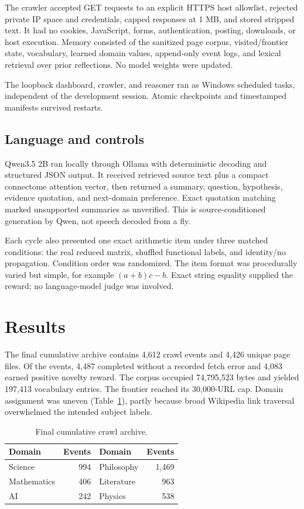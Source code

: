 \documentclass[9pt,twocolumn]{extarticle}
\begin{document}
The crawler accepted GET requests to an explicit HTTPS host allowlist, rejected private IP space and credentials, capped responses at 1 MB, and stored stripped text. It had no cookies, JavaScript, forms, authentication, posting, downloads, or host execution. Memory consisted of the sanitized page corpus, visited/frontier state, vocabulary, learned domain values, append-only event logs, and lexical retrieval over prior reflections. No model weights were updated.

The loopback dashboard, crawler, and reasoner ran as Windows scheduled tasks, independent of the development session. Atomic checkpoints and timestamped manifests survived restarts.

\subsection{Language and controls}
Qwen3.5 2B ran locally through Ollama with deterministic decoding and structured JSON output. It received retrieved source text plus a compact connectome attention vector, then returned a summary, question, hypothesis, evidence quotation, and next-domain preference. Exact quotation matching marked unsupported summaries as unverified. This is source-conditioned generation by Qwen, not speech decoded from a fly.

Each cycle also presented one exact arithmetic item under three matched conditions: the real reduced matrix, shuffled functional labels, and identity/no propagation. Condition order was randomized. The item format was procedurally varied but simple, for example $(a+b)c-b$. Exact string equality supplied the reward; no language-model judge was involved.

\section{Results}
The final cumulative archive contains 4,612 crawl events and 4,426 unique page files. Of the events, 4,487 completed without a recorded fetch error and 4,083 earned positive novelty reward. The corpus occupied 74,795,523 bytes and yielded 197,413 vocabulary entries. The frontier reached its 30,000-URL cap. Domain assignment was uneven (Table~\ref{tab:crawl}), partly because broad Wikipedia link traversal overwhelmed the intended subject labels.

\begin{table}[h]
\centering
\caption{Final cumulative crawl archive.}
\label{tab:crawl}
\small
\begin{tabular}{lr@{\qquad}lr}
\toprule
Domain & Events & Domain & Events\\
\midrule
Science & 994 & Philosophy & 1,469\\
Mathematics & 406 & Literature & 963\\
AI & 242 & Physics & 538\\
\bottomrule
\end{tabular}
\end{table}
\end{document}
